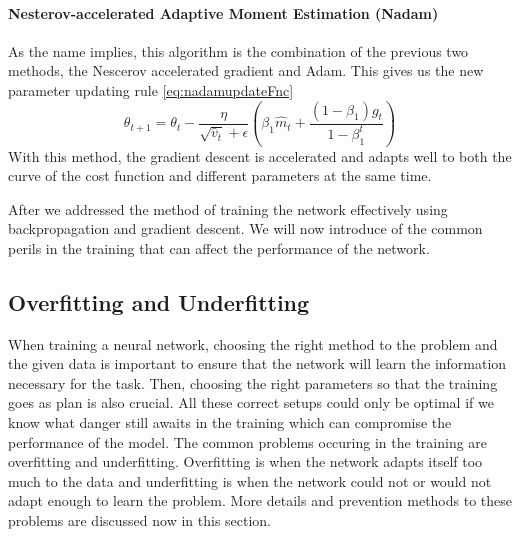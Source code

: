 \paragraph*{Nesterov-accelerated Adaptive Moment Estimation (Nadam)} As the name implies, this algorithm is the combination of the previous two methods, the Nescerov accelerated gradient and Adam. This gives us the new parameter updating rule \eqref{eq:nadamupdateFnc} 
	\begin{equation} \label{eq:nadamupdateFnc}
			\theta_{t+1} = \theta_t - \frac{\eta}{\sqrt{\hat{v}_t} + \epsilon} \left( \beta_1\hat{m}_t + \frac{(1 - \beta_1)g_t}{1 - \beta_1^t} \right)
	\end{equation}
With this method, the gradient descent is accelerated and adapts well to both the curve of the cost function and different parameters at the same time.

After we addressed the method of training the network effectively using backpropagation and gradient descent. We will now introduce of the common perils in the training that can affect the performance of the network.

\subsection{Overfitting and Underfitting}
When training a neural network, choosing the right method to the problem and the given data is important to ensure that the network will learn the information necessary for the task. Then, choosing the right parameters so that the training goes as plan is also crucial. All these correct setups could only be optimal if we know what danger still awaits in the training which can compromise the performance of the model. The common problems occuring in the training are overfitting and underfitting. Overfitting is when the network adapts itself too much to the data and underfitting is when the network could not or would not adapt enough to learn the problem. More details and prevention methods to these problems are discussed now in this section. 
 
